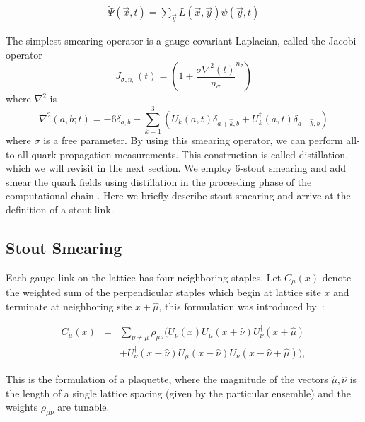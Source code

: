 \begin{align}
    \tilde{\Psi}(\vec{x},t) = \sum_{\vec{y}} L(\vec{x},\vec{y})\psi(\vec{y},t)
\end{align}

The simplest smearing operator is a gauge-covariant Laplacian, called the Jacobi operator \cite{peardon_novel_2009} 
\begin{equation}
    J_{\sigma,n_\sigma}(t) = \left(1 + \frac{\sigma\nabla^2(t)}{n_\sigma}^{n_\sigma}\right)
\end{equation} where $\nabla^2$ is \cite{10.5555/3029317}
\begin{equation}\label{eq:laplace}
    \nabla^2(a,b;t) =  -6\delta_{a,b} + \sum_{k=1}^{3} \left(U_k(a,t)\delta_{a+\hat{k},b} + U_k^{\dagger}(a,t)\delta_{a-\hat{k},b}\right)
\end{equation}
where $\sigma$ is a free parameter. 
By using this smearing operator, we can perform all-to-all quark propagation measurements. This construction is called distillation, which we will revisit in the next section.  
We employ 6-stout smearing \cite{stout} and add smear the quark fields using distillation in the proceeding phase of the computational chain \cite{peardon_novel_2009}. Here we briefly describe stout smearing and arrive at the definition of a stout link. 

\subsection{Stout Smearing}
Each gauge link on the lattice has four neighboring staples. 
Let $C_\mu(x)$ denote the weighted sum of the perpendicular staples which
begin at lattice site $x$ and terminate at neighboring site 
$x\!+\!\hat{\mu}$, this formulation was introduced by~\cite{stout}:

\begin{eqnarray}
 C_\mu(x)&=&\sum_{\nu\neq \mu}\rho_{\mu\nu}\biggl(
 U_\nu(x) U_\mu(x\!+\!\hat{\nu}) U_\nu^\dagger(x\!+\!\hat{\mu})\nonumber\\
&&+ U^\dagger_\nu(x\!-\!\hat{\nu}) U_\mu(x\!-\!\hat{\nu})
  U_\nu(x\!-\!\hat{\nu}\!+\!\hat{\mu})
\biggr), \label{eq:Cdef}
\end{eqnarray}

This is the formulation of a plaquette, where the magnitude of the vectors $\hat{\mu}, \hat{\nu}$ is the length of a single lattice spacing (given by the particular ensemble) and the weights $\rho_{\mu\nu}$ are tunable. 

